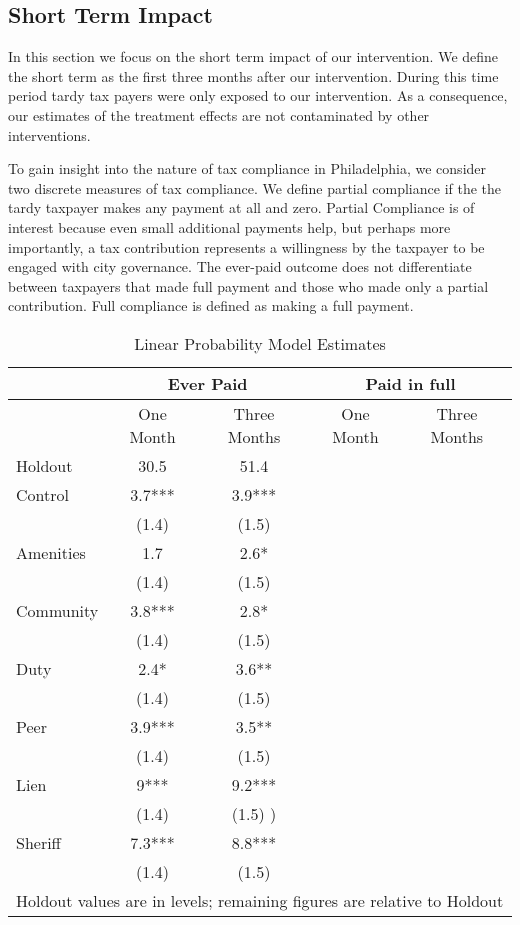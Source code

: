 \documentclass[12pt]{article}
\begin{document}
\subsection{Short Term Impact}

In this section we focus on the short term impact of our intervention. We define the
short term as the first three months after our intervention. During this time period
tardy tax payers were only exposed to our intervention. As a consequence, our estimates
of the treatment effects are not contaminated by other interventions.

To gain insight into the nature of tax compliance in Philadelphia, 
we consider two discrete measures of tax compliance. We define partial compliance if the
 the tardy taxpayer makes any payment at all  and zero.  
Partial Compliance is of interest because even small 
additional payments help, but perhaps more importantly, a tax 
contribution represents a willingness by the taxpayer to be engaged 
with city governance.  The ever-paid outcome does not differentiate between
taxpayers that made full payment and those who made only a partial
contribution.  Full compliance is defined as making a full payment. 

\begin{table}[htbp]
\centering
\caption{Linear Probability Model Estimates} \label{pc_rates_s}
\bigskip
\begin{tabular}{l c c c c}
\hline
& \multicolumn{2}{c}{Ever Paid} & \multicolumn{2}{c}{Paid in full} \\
\hline
               & One Month & Three Months & One Month & Three Months \\
\hline
 Holdout & 30.5 & 51.4  & & \\ 
   \hline
Control & 3.7*** & 3.9*** & &  \\ 
   & (1.4) & (1.5)  & & \\ 
  Amenities & 1.7 & 2.6* & &  \\ 
   & (1.4) & (1.5)  & & \\ 
  Community & 3.8*** & 2.8*  & & \\ 
   & (1.4) & (1.5) & & \\ 
  Duty & 2.4* & 3.6** & &  \\ 
   & (1.4) & (1.5) & & \\ 
  Peer & 3.9*** & 3.5** & &  \\ 
   & (1.4) & (1.5)  & & \\ 
  Lien & 9*** & 9.2*** & &   \\ 
   & (1.4) & (1.5) ) & &  \\ 
  Sheriff & 7.3*** & 8.8*** & &  \\ 
   & (1.4) & (1.5) & &  \\ 
 \hline 
 \multicolumn{5}{l}{\scriptsize{Holdout values are in levels; remaining figures are relative to Holdout}} \\ 
\end{tabular}
\end{table}
\end{document}
